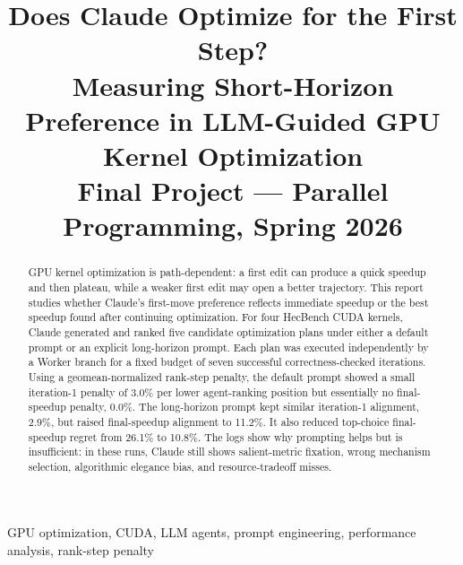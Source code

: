 \documentclass[conference]{IEEEtran}
\begin{document}
\title{Does Claude Optimize for the First Step?\\[0.1ex]
{\large\textbf{Measuring Short-Horizon Preference in LLM-Guided GPU Kernel Optimization}}\\[0.1ex]
{\normalsize Final Project --- Parallel Programming, Spring 2026}\vspace{0.1ex}}

\author{%
\and
{}
\and
{}
%
}

\maketitle

\begin{abstract}
GPU kernel optimization is path-dependent: a first edit can produce a quick
speedup and then plateau, while a weaker first edit may open a better
trajectory. This report studies whether Claude's first-move preference reflects
immediate speedup or the best speedup found after continuing optimization. For
four HecBench CUDA kernels, Claude generated and ranked five candidate
optimization plans under either a default prompt or an explicit long-horizon
prompt. Each plan was executed independently by a Worker branch for a fixed
budget of seven successful correctness-checked iterations. Using a
geomean-normalized rank-step penalty, the default prompt showed a small
iteration-1 penalty of 3.0\% per lower agent-ranking position but essentially
no final-speedup penalty, 0.0\%. The long-horizon prompt kept similar
iteration-1 alignment, 2.9\%, but raised final-speedup alignment to 11.2\%.
It also reduced top-choice final-speedup regret from 26.1\% to 10.8\%. The
logs show why prompting helps but is insufficient: in these runs, Claude still
shows salient-metric fixation, wrong mechanism selection, algorithmic elegance
bias, and resource-tradeoff misses.
\end{abstract}

\begin{IEEEkeywords}
GPU optimization, CUDA, LLM agents, prompt engineering, performance analysis,
rank-step penalty
\end{IEEEkeywords}
\end{document}

